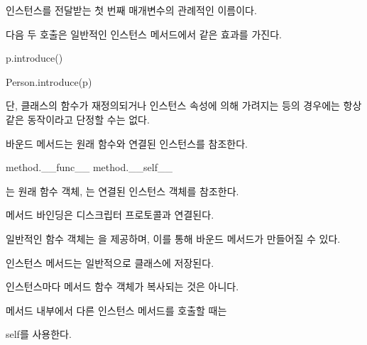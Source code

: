 인스턴스를 전달받는 첫 번째 매개변수의 관례적인 이름이다.

\begin{dhknote}
\begin{dhksmry}[centered]
다음 두 호출은 일반적인 인스턴스 메서드에서 같은 효과를 가진다.
\end{dhksmry}
\end{dhknote}

\begin{dhkcode}
p.introduce()

Person.introduce(p)
\end{dhkcode}

단, 클래스의 함수가 재정의되거나 인스턴스 속성에 의해 가려지는 등의 경우에는 항상 같은 동작이라고 단정할 수는 없다.

\begin{dhknote}
\begin{dhksmry}[centered]
바운드 메서드는 원래 함수와 연결된 인스턴스를 참조한다.
\end{dhksmry}
\end{dhknote}

\begin{dhkcode}
method.__func__
method.__self__
\end{dhkcode}

는 원래 함수 객체, 는 연결된 인스턴스 객체를 참조한다.

\begin{dhknote}
\begin{dhksmry}[centered]
메서드 바인딩은 디스크립터 프로토콜과 연결된다.
\end{dhksmry}
\end{dhknote}

일반적인 함수 객체는 을 제공하며, 이를 통해 바운드 메서드가 만들어질 수 있다.

\begin{dhknote}
\begin{dhksmry}[centered]
인스턴스 메서드는 일반적으로 클래스에 저장된다.
\end{dhksmry}
\end{dhknote}

인스턴스마다 메서드 함수 객체가 복사되는 것은 아니다.

\begin{dhknote}
\begin{dhksmry}[centered]
메서드 내부에서 다른 인스턴스 메서드를 호출할 때는 

self를 사용한다.
\end{dhksmry}
\end{dhknote}

